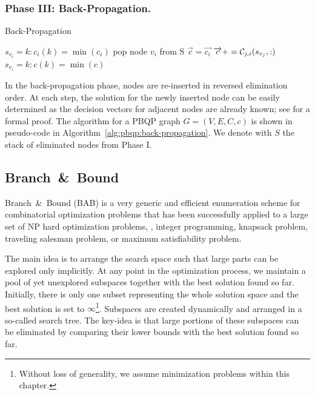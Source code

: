 \subsubsection{Phase III: Back-Propagation.}
\begin{algorithm}
\caption{Back-Propagation}
\label{alg:pbqp:back-propagation}
\begin{algorithmic}
  \STATE $s_{v_i} = k : c_i(k) = \min(c_i)$
  \ENDFOR
  \STATE pop node $v_i$ from S
  \STATE $\vec{c} = \vec{c_i}$
  \STATE $\overrightarrow{c} += {\mathcal C}_{j,i}(s_{v_j},:)$
  \ENDFOR
  \STATE $s_{v_i} = k : c(k) = \min(c)$
  \ENDWHILE
\end{algorithmic}
\end{algorithm}
In the back-propagation phase, nodes are re-inserted in reversed
elimination order. At each step, the solution for the newly inserted
node can be easily determined as the decision vectors for adjacent
nodes are already known; see \cite{Eck03} for a formal proof. The
algorithm for a PBQP graph $G=(V,E,C,c)$ is shown in pseudo-code in
Algorithm~\ref{alg:pbqp:back-propagation}. We denote with $S$ the
stack of eliminated nodes from Phase I.

\subsection{Branch~\&~Bound}
\label{sec:pbqp:bab}
Branch~\&~Bound (BAB) is a very generic and efficient enumeration
scheme for combinatorial optimization problems that has been
successfully applied to a large set of NP hard optimization problems,
\eg, integer programming, knapsack problem, traveling salesman
problem, or maximum satisfiability problem.

The main idea is to arrange the search space such that large parts can
be explored only implicitly. At any point in the optimization process,
we maintain a pool of yet unexplored subspaces together with the best
solution found so far. Initially, there is only one subset
representing the whole solution space and the best solution is set to
$\infty$\footnote{Without loss of generality, we assume minimization
  problems within this chapter.}. Subspaces are created dynamically
and arranged in a so-called search tree. The key-idea is that large
portions of these subspaces can be eliminated by comparing their lower
bounds with the best solution found so far.

